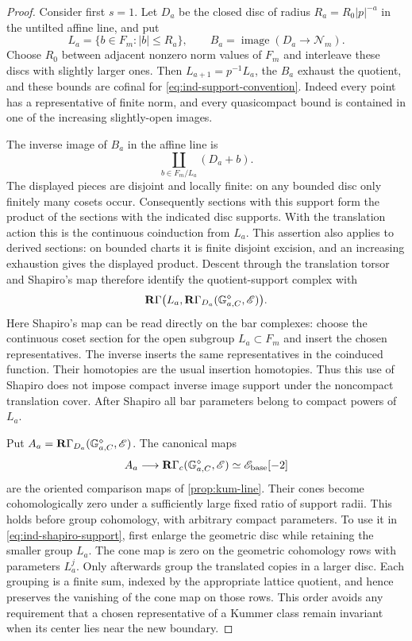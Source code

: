 \begin{proof}
Consider first $s=1$.  Let $D_a$ be the closed disc of radius
$R_a=R_0|p|^{-a}$ in the untilted affine line, and put
\[
 L_a=\{b\in F_m:|b|\leq R_a\},\qquad
 B_a=\operatorname{image}(D_a\longrightarrow\mathcal N_m).
\]
Choose $R_0$ between adjacent nonzero norm values of $F_m$ and
interleave these discs with slightly larger ones.  Then
$L_{a+1}=p^{-1}L_a$, the $B_a$ exhaust the quotient, and these bounds
are cofinal for \cref{eq:ind-support-convention}.  Indeed every point
has a representative of finite norm, and every quasicompact bound is
contained in one of the increasing slightly-open images.

The inverse image of $B_a$ in the affine line is
\[
 \coprod_{b\in F_m/L_a}(D_a+b).
\]
The displayed pieces are disjoint and locally finite: on any bounded
disc only finitely many cosets occur.  Consequently sections with
this support form the product of the sections with the indicated
disc supports.  With the translation action this is the continuous
coinduction from $L_a$.  This assertion also applies to derived
sections: on bounded charts it is finite disjoint excision, and an
increasing exhaustion gives the displayed product.  Descent through
the translation torsor and Shapiro's map therefore identify the
quotient-support complex with
\begin{equation}
 \label{eq:ind-shapiro-support}
 \mathbf R\Gamma\bigl(L_a,
    \mathbf R\Gamma_{D_a}(\mathbb G_{a,C}^{\diamond},\mathscr E)\bigr).
\end{equation}
Here Shapiro's map can be read directly on the bar complexes: choose
the continuous coset section for the open subgroup $L_a\subset F_m$
and insert the chosen representatives.  The inverse inserts the
same representatives in the coinduced function.  Their homotopies
are the usual insertion homotopies.  Thus this use of Shapiro does
not impose compact inverse image support under the noncompact
translation cover.  After Shapiro all bar parameters belong to
compact powers of $L_a$.

Put
$A_a=\mathbf R\Gamma_{D_a}(\mathbb G_{a,C}^{\diamond},\mathscr E)$.
The canonical maps
\[
 A_a\longrightarrow
 \mathbf R\Gamma_c(\mathbb G_{a,C}^{\diamond},\mathscr E)
       \simeq \mathscr E_{\mathrm{base}}[-2]
\]
are the oriented comparison maps of \cref{prop:kum-line}.
Their cones become cohomologically zero under a sufficiently large
fixed ratio of support radii.  This holds before group cohomology,
with arbitrary compact parameters.  To use it in
\cref{eq:ind-shapiro-support}, first enlarge the geometric disc while
retaining the smaller group $L_a$.  The cone map is zero on the
geometric cohomology rows with parameters $L_a^j$.  Only afterwards
group the translated copies in a larger disc.  Each grouping is a
finite sum, indexed by the appropriate lattice quotient, and hence
preserves the vanishing of the cone map on those rows.  This order
avoids any requirement that a chosen representative of a Kummer
class remain invariant when its center lies near the new boundary.


\end{proof}
